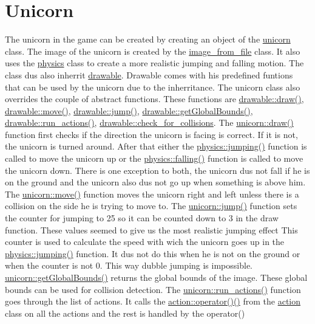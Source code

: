 \hypertarget{index_unicorn}{}\section{Unicorn}\label{index_unicorn}
The unicorn in the game can be created by creating an object of the \hyperlink{classunicorn}{unicorn} class. The image of the unicorn is created by the \hyperlink{classimage__from__file}{image\+\_\+from\+\_\+file} class. It also uses the \hyperlink{classphysics}{physics} class to create a more realistic jumping and falling motion. The class dus also inherrit \hyperlink{classdrawable}{drawable}. Drawable comes with his predefined funtions that can be used by the unicorn due to the inherritance. The unicorn class also overrides the couple of abstract functions. These functions are \hyperlink{classdrawable_a4e49e2c1121704c83ce24c5f48dd910f}{drawable\+::draw()}, \hyperlink{classdrawable_ad0d3930c045cc6776aa2c3965be32491}{drawable\+::move()}, \hyperlink{classdrawable_ac39691470b7874f5dec59efe649d3981}{drawable\+::jump()}, \hyperlink{classdrawable_ae013ac0be47538be9ce885d6642daf73}{drawable\+::get\+Global\+Bounds()}, \hyperlink{classdrawable_a715df01a318331e5611a2b0ad30109ff}{drawable\+::run\+\_\+actions()}, \hyperlink{classdrawable_abbc6e0089d502ba48c3fcb9c96e3966e}{drawable\+::check\+\_\+for\+\_\+collisions}. The \hyperlink{classunicorn_a570c34d5669a8d2a61bdc1481e6f9dee}{unicorn\+::draw()} function first checks if the direction the unicorn is facing is correct. If it is not, the unicorn is turned around. After that either the \hyperlink{classphysics_aaf1c57aa6e35b9c83ccbfdfa8c18468c}{physics\+::jumping()} function is called to move the unicorn up or the \hyperlink{classphysics_acca1ee2fb8b760b6e4ee61ae7c2ee3da}{physics\+::falling()} function is called to move the unicorn down. There is one exception to both, the unicorn dus not fall if he is on the ground and the unicorn also dus not go up when something is above him. The \hyperlink{classunicorn_a162f200a68342f7bc0baaf17c8cf3f9f}{unicorn\+::move()} function moves the unicorn right and left unless there is a collision on the side he is trying to move to. The \hyperlink{classunicorn_a07d5ca4e66632c0e871221a27146805a}{unicorn\+::jump()} function sets the counter for jumping to 25 so it can be counted down to 3 in the draw function. These values seemed to give us the most realistic jumping effect This counter is used to calculate the speed with wich the unicorn goes up in the \hyperlink{classphysics_aaf1c57aa6e35b9c83ccbfdfa8c18468c}{physics\+::jumping()} function. It dus not do this when he is not on the ground or when the counter is not 0. This way dubble jumping is impossible. \hyperlink{classunicorn_a1bac09fc59b04f14f5a093bc4daa04da}{unicorn\+::get\+Global\+Bounds()} returns the global bounds of the image. These global bounds can be used for collision detection. The \hyperlink{classunicorn_aadb47a9981c46d6add8704074df117df}{unicorn\+::run\+\_\+actions()} function goes through the list of actions. It calls the \hyperlink{classaction_ab4f8d0f7552450455977d09a889c18c7}{action\+::operator()()} from the \hyperlink{classaction}{action} class on all the actions and the rest is handled by the operator() 